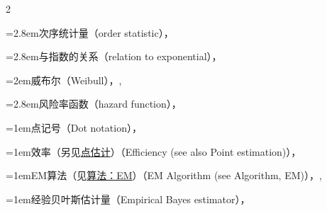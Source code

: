 \begin{multicols}{2}
\par\noindent\hangindent=2.8em\hspace*{1.8em}\label{idx:389}次序统计量（order statistic），\hyperref[ex:5.4.5]{\pageref*{ex:5.4.5}}\par
\par\noindent\hangindent=2.8em\hspace*{1.8em}\label{idx:390}与指数的关系（relation to exponential），\hyperref[ex:2.1.4]{\pageref*{ex:2.1.4}}\par
\par\noindent\hangindent=2em\hspace*{1em}\label{idx:391}威布尔（Weibull），\hyperref[eq:3.3.12]{\pageref*{eq:3.3.12}}, \hyperref[idxocc:391:139]{\pageref*{idxocc:391:139}}\par
\par\noindent\hangindent=2.8em\hspace*{1.8em}\label{idx:392}风险率函数（hazard function），\hyperref[idxocc:392:139]{\pageref*{idxocc:392:139}}\par
\par\addvspace{2pt}
\par\noindent\hangindent=1em\hspace*{0em}\label{idx:393}点记号（Dot notation），\hyperref[idxocc:393:457]{\pageref*{idxocc:393:457}}\par
\par\addvspace{2pt}
\par\noindent\hangindent=1em\hspace*{0em}\label{idx:394}效率（另见\hyperref[idx:763]{点估计}）（Efficiency (see also Point estimation)），\hyperref[sec:10.1.2]{\pageref*{sec:10.1.2}}\par
\par\addvspace{2pt}
\par\noindent\hangindent=1em\hspace*{0em}\label{idx:395}EM算法（见\hyperref[idx:7]{算法：EM}）（EM Algorithm (see Algorithm, EM)），\hyperref[sec:7.2.4]{\pageref*{sec:7.2.4}}, \hyperref[sec:7.5.4]{\pageref*{sec:7.5.4}}\par
\par\addvspace{2pt}
\par\noindent\hangindent=1em\hspace*{0em}\label{idx:396}经验贝叶斯估计量（Empirical Bayes estimator），\hyperref[idxocc:396:331]{\pageref*{idxocc:396:331}}\par

\end{multicols}
